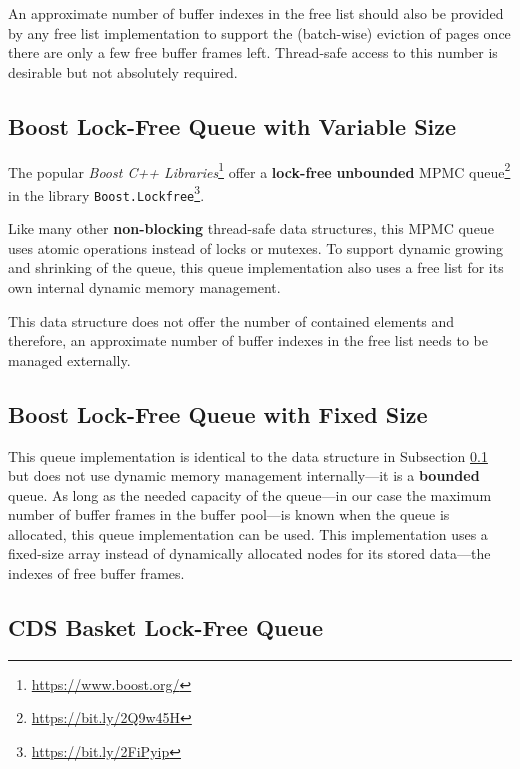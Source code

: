 	An approximate number of buffer indexes in the free list should also be provided by any free list implementation to support the (batch-wise) eviction of pages once there are only a few free buffer frames left. Thread-safe access to this number is desirable but not absolutely required.

\subsection[Boost Lock-Free Queue with Variable Size]{Boost Lock-Free Queue with Variable Size} \label{subsec:boost}

	The popular \textit{Boost C++ Libraries}\footnote{\url{https://www.boost.org/}} offer a \textbf{lock-free} \textbf{unbounded} MPMC queue\footnote{\url{https://bit.ly/2Q9w45H}} in the library \texttt{Boost.Lockfree}\footnote{\url{https://bit.ly/2FiPyip}}.

    Like many other \textbf{non-blocking} thread-safe data structures, this MPMC queue uses atomic operations instead of locks or mutexes. To support dynamic growing and shrinking of the queue, this queue implementation also uses a free list for its own internal dynamic memory management.
	
	This data structure does not offer the number of contained elements and therefore, an approximate number of buffer indexes in the free list needs to be managed externally.

\subsection[Boost Lock-Free Queue with Fixed Size]{Boost Lock-Free Queue with Fixed Size} \label{subsec:boost-fixed}

	This queue implementation is identical to the data structure in Subsection \ref{subsec:boost} but does not use dynamic memory management internally---it is a \textbf{bounded} queue. As long as the needed capacity of the queue---in our case the maximum number of buffer frames in the buffer pool---is known when the queue is allocated, this queue implementation can be used. This implementation uses a fixed-size array instead of dynamically allocated nodes for its stored data---the indexes of free buffer frames.

\subsection[CDS BasketQueue]{CDS Basket Lock-Free Queue} \label{subsec:cds-basket}

